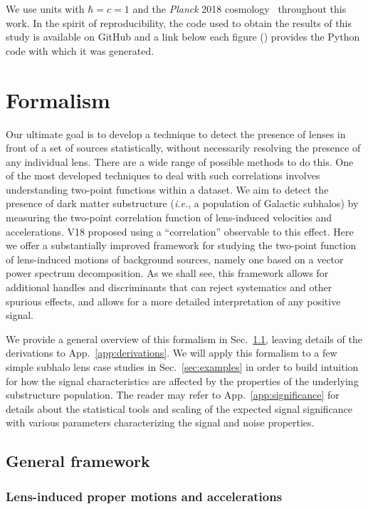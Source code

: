 \documentclass[prd,aps,twocolumn,nofootinbib,superscriptaddress,preprintnumbers,balancelastpage,longbibliography,floatfix]{revtex4-1}
\begin{document}
We use units with $\hbar = c  = 1$ and the \textit{Planck} 2018 cosmology~\cite{Aghanim:2018eyx} throughout this work. In the spirit of reproducibility, the code used to obtain the results of this study is available on GitHub \githubmaster and a link below each figure (\nbicon) provides the Python code with which it was generated.

\section{Formalism}
\label{sec:singlesh}
Our ultimate goal is to develop a technique to detect the presence of lenses in front of a set of sources statistically, without necessarily resolving the presence of any individual lens. There are a wide range of possible methods to do this. One of the most developed techniques to deal with such correlations involves understanding two-point functions within a dataset. 
We aim to detect the presence of dark matter substructure (\emph{i.e.}, a population of Galactic subhalos) by measuring the two-point correlation function of lens-induced velocities and accelerations. V18 proposed using a ``correlation'' observable to this effect. Here we offer a substantially improved framework for studying the two-point function of lens-induced motions of background sources, namely one based on a vector power spectrum decomposition. As we shall see, this framework allows for additional handles and discriminants that can reject systematics and other spurious effects, and allows for a more detailed interpretation of any positive signal.

We provide a general overview of this formalism in Sec.~\ref{sec:formalism}, leaving details of the derivations to App.~\ref{app:derivations}. We will apply this formalism to a few simple subhalo lens case studies in Sec.~\ref{sec:examples} in order to build intuition for how the signal characteristics are affected by the properties of the underlying substructure population. The reader may refer to App.~\ref{app:significance} for details about the statistical tools and scaling of the expected signal significance with various parameters characterizing the signal and noise properties.

\subsection{General framework}
\label{sec:formalism}

\subsubsection*{Lens-induced proper motions and accelerations}
\end{document}
